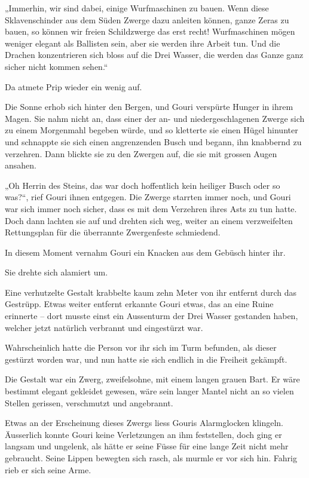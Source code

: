 „Immerhin, wir sind dabei, einige Wurfmaschinen zu bauen. Wenn diese Sklavenschinder aus dem Süden Zwerge dazu anleiten können, ganze Zeras zu bauen, so können wir freien Schildzwerge das erst recht! Wurfmaschinen mögen weniger elegant als Ballisten sein, aber sie werden ihre Arbeit tun. Und die Drachen konzentrieren sich bloss auf die Drei Wasser, die werden das Ganze ganz sicher nicht kommen sehen.“

Da atmete Prip wieder ein wenig auf.



\trennzeichen



Die Sonne erhob sich hinter den Bergen, und Gouri verspürte Hunger in ihrem Magen. Sie nahm nicht an, dass einer der an- und niedergeschlagenen Zwerge sich zu einem Morgenmahl begeben würde, und so kletterte sie einen Hügel hinunter und schnappte sie sich einen angrenzenden Busch und begann, ihn knabbernd zu verzehren. Dann blickte sie zu den Zwergen auf, die sie mit grossen Augen ansahen.

„Oh Herrin des Steins, das war doch hoffentlich kein heiliger Busch oder so was?“, rief Gouri ihnen entgegen. Die Zwerge starrten immer noch, und Gouri war sich immer noch sicher, dass es mit dem Verzehren ihres Asts zu tun hatte. Doch dann lachten sie auf und drehten sich weg, weiter an einem verzweifelten Rettungsplan für die überrannte Zwergenfeste schmiedend.

In diesem Moment vernahm Gouri ein Knacken aus dem Gebüsch hinter ihr.

Sie drehte sich alamiert um.

Eine verhutzelte Gestalt krabbelte kaum zehn Meter von ihr entfernt durch das Gestrüpp. Etwas weiter entfernt erkannte Gouri etwas, das an eine Ruine erinnerte – dort musste einst ein Aussenturm der Drei Wasser gestanden haben, welcher jetzt natürlich verbrannt und eingestürzt war.

Wahrscheinlich hatte die Person vor ihr sich im Turm befunden, als dieser gestürzt worden war, und nun hatte sie sich endlich in die Freiheit gekämpft.

Die Gestalt war ein Zwerg, zweifelsohne, mit einem langen grauen Bart. Er wäre bestimmt elegant gekleidet gewesen, wäre sein langer Mantel nicht an so vielen Stellen gerissen, verschmutzt und angebrannt.

Etwas an der Erscheinung dieses Zwergs liess Gouris Alarmglocken klingeln. Äusserlich konnte Gouri keine Verletzungen an ihm feststellen, doch ging er langsam und ungelenk, als hätte er seine Füsse für eine lange Zeit nicht mehr gebraucht. Seine Lippen bewegten sich rasch, als murmle er vor sich hin. Fahrig rieb er sich seine Arme.

